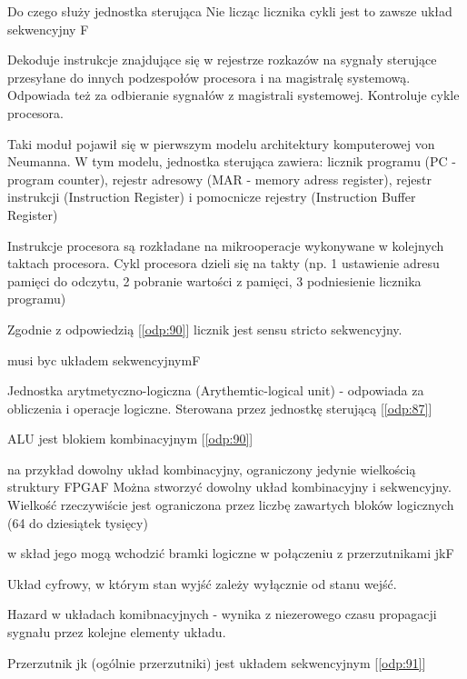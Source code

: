 \answer
{Do czego służy jednostka sterująca}
{Nie licząc licznika cykli jest to zawsze układ sekwencyjny}
{F}
{
\cite{js} Dekoduje instrukcje znajdujące się w rejestrze rozkazów na sygnały sterujące przesyłane do innych podzespołów procesora i na magistralę systemową. Odpowiada też za odbieranie sygnałów z magistrali systemowej. Kontroluje cykle procesora.

\cite{uw} Taki moduł pojawił się w pierwszym modelu architektury komputerowej von Neumanna. W tym modelu, jednostka sterująca zawiera: licznik programu (PC - program counter), rejestr adresowy (MAR - memory adress register), rejestr instrukcji (Instruction Register) i pomocnicze rejestry (Instruction Buffer Register)

\cite{js} Instrukcje procesora są rozkładane na mikrooperacje wykonywane w kolejnych taktach procesora. Cykl procesora dzieli się na takty (np. 1 ustawienie adresu pamięci do odczytu, 2 pobranie wartości z pamięci, 3 podniesienie licznika programu)

}
{Zgodnie z odpowiedzią [\ref{odp:90}] licznik jest sensu stricto sekwencyjny.}
\label{odp:87}

{musi byc układem sekwencyjnym}{F}
{
Jednostka arytmetyczno-logiczna (Arythemtic-logical unit) - odpowiada za obliczenia i operacje logiczne. Sterowana przez jednostkę sterującą [\ref{odp:87}]

}
{\cite{uk} ALU jest blokiem kombinacyjnym [\ref{odp:90}]}

{na przykład dowolny układ kombinacyjny, ograniczony jedynie wielkością struktury FPGA}{F}
{Można stworzyć dowolny układ kombinacyjny i sekwencyjny. Wielkość rzeczywiście jest ograniczona przez liczbę zawartych bloków logicznych (64 do dziesiątek tysięcy)}
{}

{w skład jego mogą wchodzić bramki logiczne w połączeniu z przerzutnikami jk}{F}
{
Układ cyfrowy, w którym stan wyjść zależy wyłącznie od stanu wejść.

Hazard w układach komibnacyjnych - wynika z niezerowego czasu propagacji sygnału przez kolejne elementy układu.

}
{Przerzutnik jk (ogólnie przerzutniki) jest układem sekwencyjnym [\ref{odp:91}]}
\label{odp:90}

